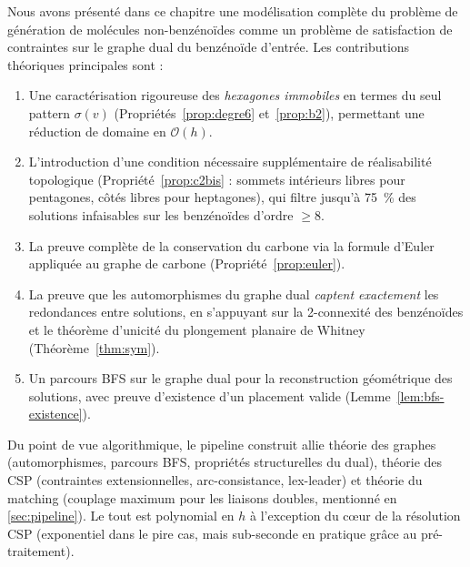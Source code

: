 \documentclass[12pt,a4paper]{article}
\theoremstyle{definition}
\theoremstyle{remark}
\newcommand{\bigO}{\mathcal{O}}
\begin{document}
Nous avons pr\'esent\'e dans ce chapitre une mod\'elisation compl\`ete
du probl\`eme de g\'en\'eration de mol\'ecules non-benz\'eno\"ides comme
un probl\`eme de satisfaction de contraintes sur le graphe dual du
benz\'eno\"ide d'entr\'ee. Les contributions th\'eoriques principales
sont :
\begin{enumerate}[leftmargin=*]
  \item Une caract\'erisation rigoureuse des \emph{hexagones immobiles}
        en termes du seul pattern $\sigma(v)$
        (Propri\'et\'es~\ref{prop:degre6} et~\ref{prop:b2}), permettant
        une r\'eduction de domaine en $\bigO(h)$.
  \item L'introduction d'une condition n\'ecessaire suppl\'ementaire
        de r\'ealisabilit\'e topologique
        (Propri\'et\'e~\ref{prop:c2bis} : sommets int\'erieurs libres
        pour pentagones, c\^ot\'es libres pour heptagones), qui filtre
        jusqu'\`a 75~\% des solutions infaisables sur les benz\'eno\"ides
        d'ordre $\geq 8$.
  \item La preuve compl\`ete de la conservation du carbone via la
        formule d'Euler appliqu\'ee au graphe de carbone
        (Propri\'et\'e~\ref{prop:euler}).
  \item La preuve que les automorphismes du graphe dual \emph{captent
        exactement} les redondances entre solutions, en s'appuyant sur
        la 2-connexit\'e des benz\'eno\"ides et le th\'eor\`eme
        d'unicit\'e du plongement planaire de Whitney
        (Th\'eor\`eme~\ref{thm:sym}).
  \item Un parcours BFS sur le graphe dual pour la reconstruction
        g\'eom\'etrique des solutions, avec preuve d'existence d'un
        placement valide (Lemme~\ref{lem:bfs-existence}).
\end{enumerate}

Du point de vue algorithmique, le pipeline construit allie th\'eorie
des graphes (automorphismes, parcours BFS, propri\'et\'es structurelles
du dual), th\'eorie des CSP (contraintes extensionnelles,
arc-consistance, lex-leader) et th\'eorie du matching (couplage maximum
pour les liaisons doubles, mentionn\'e en \ref{sec:pipeline}). Le tout
est polynomial en $h$ \`a l'exception du c\oe ur de la r\'esolution CSP
(exponentiel dans le pire cas, mais sub-seconde en pratique gr\^ace au
pr\'e-traitement).
\end{document}
